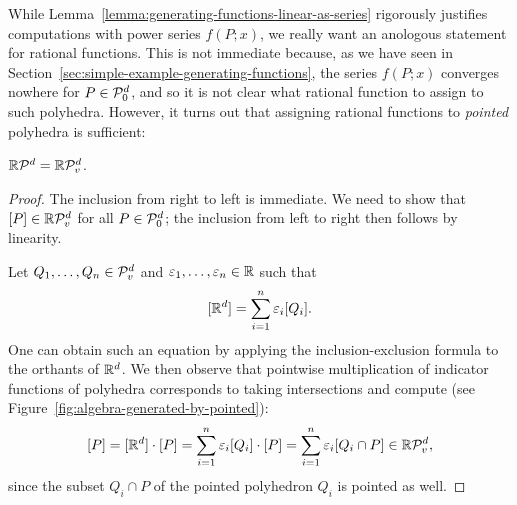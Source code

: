 While Lemma~\ref{lemma:generating-functions-linear-as-series}
rigorously justifies computations with power series $f(P;x)$,
we really want an anologous statement for rational functions.
This is not immediate because, as we have seen in Section~\ref{sec:simple-example-generating-functions},
the series $f(P;x)$ converges nowhere for $P \in \mathcal{P}_0^d$,
and so it is not clear what rational function to assign to such polyhedra.
However, it turns out that assigning rational functions to \emph{pointed} polyhedra is sufficient:

\begin{lemma}
  \label{lemma:algebra-generated-by-pointed}
  $\mathbb{R} \mathcal{P}^d = \mathbb{R}\mathcal{P}_v^d$.
\end{lemma}
\begin{proof}
  The inclusion from right to left is immediate.
  We need to show that $[P] \in \mathbb{R}\mathcal{P}_v^d$ for all $P \in \mathcal{P}_0^d$;
  the inclusion from left to right then follows by linearity.

  Let $Q_1, \ldots, Q_n \in \mathcal{P}_v^d$ and $\varepsilon_1, \ldots, \varepsilon_n \in \mathbb{R}$ such that
  \[
    [\mathbb{R}^d] = \sum_{i=1}^n \varepsilon_i [Q_i].
  \]
  One can obtain such an equation by applying the inclusion-exclusion formula to the orthants of $\mathbb{R}^d$.
  We then observe that pointwise multiplication of indicator functions of polyhedra
  corresponds to taking intersections and compute (see Figure~\ref{fig:algebra-generated-by-pointed}):
  \[
    [P] = [\mathbb{R}^d] \cdot [P] = \sum_{i=1}^n \varepsilon_i [Q_i] \cdot [P] = \sum_{i=1}^n \varepsilon_i [Q_i \cap P] \in \mathbb{R}\mathcal{P}_v^d,
  \]
  since the subset $Q_i \cap P$ of the pointed polyhedron $Q_i$ is pointed as well.
\end{proof}

